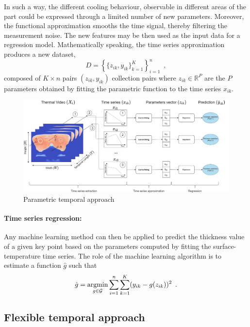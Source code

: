In such a way, the different cooling behaviour, observable in different areas of the part could be expressed through a limited number of new parameters. Moreover, the functional approximation smooths the time signal, thereby filtering the measurement noise. The new features may be then used as the input data for a regression model.
Mathematically speaking, the time series approximation produces a new dataset,
%
\begin{equation*}
    D = \left\{\{z_{ik},y_{ik}\}_{k=1}^K\right\}_{i=1}^n
    \enspace,
\end{equation*}
%
composed of $K\times n$ pairs $(z_{ik},y_{ik})$ collection pairs where ${z}_{ik} \in \mathds{R}^{P}$ are the $P$ parameters obtained by fitting the parametric function to the time series $x_{ik}$.

\begin{figure}
\centering
\includegraphics[scale=0.4]{images/chapter_4/Parametric_Temporal.png}
\caption{Parametric temporal approach}
\label{fig:parametric_temporal_approach}
\end{figure}

\paragraph{Time series regression:}
Any machine learning method can then be applied to predict the thickness value of a given key point based on the parameters computed by fitting the surface-temperature time series.  The role of the machine learning algorithm is to estimate a function $\hat{g}$ such that
\begin{equation}
    \hat{g} = \operatorname*{argmin}_{g \in \mathcal{G}} \sum_{i=1}^n \sum_{k=1}^K (y_{ik} - g(z_{ik}))^2 \enspace.
\end{equation}


\subsection{Flexible temporal approach}

